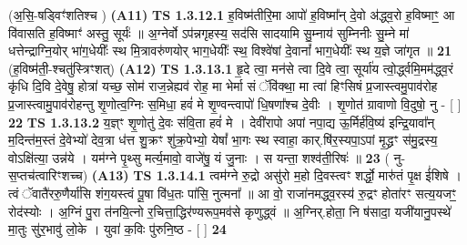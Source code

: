 \documentclass[17pt]{extarticle}
\begin{document}
                  \newline
                      (अ॒सि॒-षड्विꣳ॑शतिश्च )  \textbf{(A11)} \newline \newline
                                        \textbf{ TS 1.3.12.1} \newline
                  ह॒विष्म॑तीरि॒मा आपो॑ ह॒विष्मा᳚न् दे॒वो अ॑द्ध्व॒रो ह॒विष्माꣳ॒॒ आ वि॑वासति ह॒विष्माꣳ॑ अस्तु॒ सूर्यः॑ ॥ अ॒ग्नेर्वो ऽप॑न्नगृहस्य॒ सद॑सि सादयामि सु॒म्नाय॑ सुम्निनीः सु॒म्ने मा॑ धत्तेन्द्राग्नि॒योर् भा॑ग॒धेयीः᳚ स्थ मि॒त्रावरु॑णयोर् भाग॒धेयीः᳚ स्थ॒ विश्वे॑षां दे॒वानां᳚ भाग॒धेयीः᳚ स्थ य॒ज्ञे जा॑गृत ॥ \textbf{  21 } \newline
                  \newline
                      (ह॒विष्म॑ती॒-श्चतु॑स्त्रिꣳशत्)  \textbf{(A12)} \newline \newline
                                        \textbf{ TS 1.3.13.1} \newline
                  हृ॒दे त्वा॒ मन॑से त्वा दि॒वे त्वा॒ सूर्या॑य त्वो॒र्द्ध्वमि॒मम॑द्ध्व॒रं कृ॑धि दि॒वि दे॒वेषु॒ होत्रा॑ यच्छ॒ सोम॑ राज॒न्नेह्यव॑ रोह॒ मा भेर्मा सं ॅवि॑क्था॒ मा त्वा॑ हिꣳसिषं प्र॒जास्त्वमु॒पाव॑रोह प्र॒जास्त्वामु॒पाव॑रोहन्तु शृ॒णोत्व॒ग्निः स॒मिधा॒ हवं॑ मे शृ॒ण्वन्त्वापो॑ धि॒षणा᳚श्च दे॒वीः । शृ॒णोत॑ ग्रावाणो वि॒दुषो॒ नु - [ ] \textbf{  22} \newline
                  \newline
                                \textbf{ TS 1.3.13.2} \newline
                  य॒ज्ञ्ꣳ शृ॒णोतु॑ दे॒वः स॑वि॒ता हवं॑ मे । देवी॑रापो अपां नपा॒द्य ऊ॒र्मिर्ह॑वि॒ष्य॑ इन्द्रि॒यावा᳚न् म॒दिन्त॑म॒स्तं दे॒वेभ्यो॑ देव॒त्रा ध॑त्त शु॒क्रꣳ शु॑क्र॒पेभ्यो॒ येषां᳚ भा॒गः स्थ स्वाहा॒ कार्.षि॑र॒स्यपा॒ऽपां मृ॒द्ध्रꣳ स॑मु॒द्रस्य॒ वोऽक्षि॑त्या॒ उन्न॑ये । यम॑ग्ने पृ॒थ्सु मर्त्य॒मावो॒ वाजे॑षु॒ यं जु॒नाः । स यन्ता॒ शश्व॑ती॒रिषः॑ ॥ \textbf{  23} \newline
                  \newline
                      ( नु-स॒प्तच॑त्वारिꣳशच्च)  \textbf{(A13)} \newline \newline
                                        \textbf{ TS 1.3.14.1} \newline
                  त्वम॑ग्ने रु॒द्रो असु॑रो म॒हो दि॒वस्त्वꣳ शर्द्धो॒ मारु॑तं पृ॒क्ष ई॑शिषे । त्वं ॅवातै॑ररु॒णैर्या॑सि शंग॒यस्त्वं पू॒षा वि॑ध॒तः पा॑सि॒ नुत्मना᳚ ॥ आ वो॒ राजा॑नमद्ध्व॒रस्य॑ रु॒द्रꣳ होता॑रꣳ सत्य॒यजꣳ॒॒ रोद॑स्योः । अ॒ग्निं पु॒रा त॑नयि॒त्नो र॒चित्ता॒द्धिर॑ण्यरूप॒मव॑से कृणुद्ध्वं ॥ अ॒ग्निर्.होता॒ नि ष॑सादा॒ यजी॑यानु॒पस्थे॑ मा॒तुः सु॑र॒भावु॑ लो॒के । युवा॑ क॒विः पु॑रुनि॒ष्ठ - [ ] \textbf{  24} \newline
\end{document}
